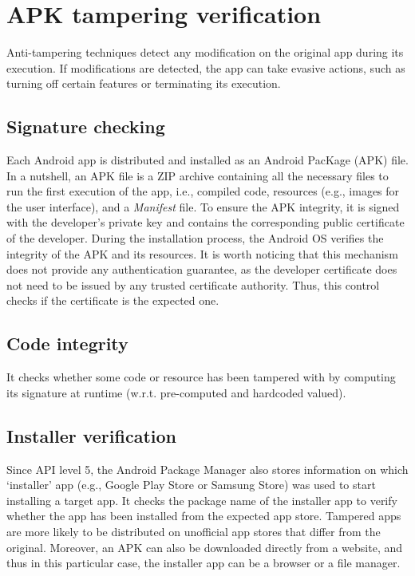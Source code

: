 \section{APK tampering verification}
Anti-tampering techniques detect any modification on the original app during its execution.
If modifications are detected, the app can take evasive actions, such as turning off certain features or terminating its execution.

\subsection{Signature checking} 
Each Android app is distributed and installed as an Android PacKage (APK) file.
In a nutshell, an APK file is a ZIP archive containing all the necessary files to run the first execution of the app, i.e., compiled code, resources (e.g., images for the user interface), and a \textit{Manifest} file.
To ensure the APK integrity, it is signed with the developer's private key and contains the corresponding public certificate of the developer.
During the installation process, the Android OS verifies the integrity of the APK and its resources.
It is worth noticing that this mechanism does not provide any authentication guarantee, as the developer certificate does not need to be issued by any trusted certificate authority.
Thus, this control checks if the certificate is the expected one.

\subsection{Code integrity} 
It checks whether some code or resource has been tampered with by computing its signature at runtime (w.r.t. pre-computed and hardcoded valued). 

\subsection{Installer verification}
Since API level 5, the Android Package Manager also stores information on which `installer' app (e.g., Google Play Store or Samsung Store) was used to start installing a target app.
It checks the package name of the installer app to verify whether the app has been installed from the expected app store.
Tampered apps are more likely to be distributed on unofficial app stores that differ from the original.
Moreover, an APK can also be downloaded directly from a website, and thus in this particular case, the installer app can be a browser or a file manager.

